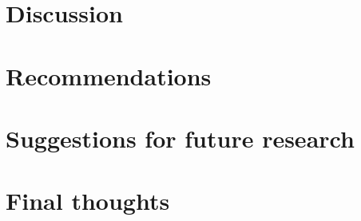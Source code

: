 \section{Discussion}

\section{Recommendations}

\section{Suggestions for future research}

\section{Final thoughts}
